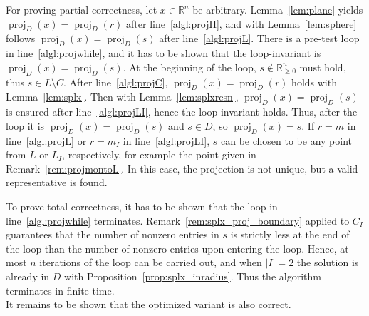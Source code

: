 \documentclass[twoside,11pt]{article}
\newenvironment{proofof}[1][Proof]{\par\noindent{\bf #1\ }}{\hfill\BlackBox\\[2mm]}
\DeclareMathOperator{\proj}{proj}
\newcommand{\R}{\mathbb{R}}
\newcommand{\0}{\mathcal{O}}
\newcommand{\abs}[1]{\left\vert #1 \right\vert}
\begin{document}
\begin{proofof}[Proof of Theorem~\ref{thm:projfunc}]
For proving partial correctness, let $x\in\R^n$ be arbitrary.
Lemma~\ref{lem:plane} yields $\proj_D(x) = \proj_D(r)$ after line~\ref{algl:projH}, and with Lemma~\ref{lem:sphere} follows $\proj_D(x) = \proj_D(s)$ after line~\ref{algl:projL}.
There is a pre-test loop in line~\ref{algl:projwhile}, and it has to be shown that the loop-invariant is $\proj_D(x) = \proj_D(s)$.
At the beginning of the loop, $s\not\in\R_{\geq 0}^n$ must hold, thus $s\in L\setminus C$.
After line~\ref{algl:projC}, $\proj_D(x) = \proj_D(r)$ holds with Lemma~\ref{lem:splx}.
Then with Lemma~\ref{lem:splxrcsn}, $\proj_D(x) = \proj_D(s)$ is ensured after line~\ref{algl:projLI}, hence the loop-invariant holds.
Thus, after the loop it is $\proj_D(x) = \proj_D(s)$ and $s\in D$, so $\proj_D(x) = s$.
If $r = m$ in line~\ref{algl:projL} or $r = m_I$ in line~\ref{algl:projLI}, $s$ can be chosen to be any point from $L$ or $L_I$, respectively, for example the point given in Remark~\ref{rem:projmontoL}.
In this case, the projection is not unique, but a valid representative is found.

To prove total correctness, it has to be shown that the loop in line~\ref{algl:projwhile} terminates.
Remark~\ref{rem:splx_proj_boundary} applied to $C_I$ guarantees that the number of nonzero entries in $s$ is strictly less at the end of the loop than the number of nonzero entries upon entering the loop.
Hence, at most $n$ iterations of the loop can be carried out, and when $\abs{I} = 2$ the solution is already in $D$ with Proposition~\ref{prop:splx_inradius}.
Thus the algorithm terminates in finite time.
\end{proofof}
It remains to be shown that the optimized variant is also correct.
\end{document}
